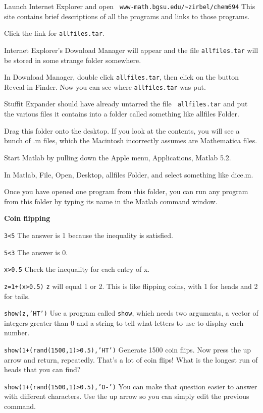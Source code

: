 \item Launch Internet Explorer and open {\tt
www-math.bgsu.edu/\~{}zirbel/chem694} 
This site contains brief descriptions of all the programs and links to
those programs.

\item Click the link for {\tt allfiles.tar}.

\item Internet Explorer's Download Manager will appear and the file
{\tt allfiles.tar} will be stored in some strange folder somewhere.

\item In Download Manager, double click {\tt allfiles.tar}, then click on
the button Reveal in Finder.  Now you can see where {\tt allfiles.tar} was
put.

\item Stuffit Expander should have already untarred the file {\tt
allfiles.tar} and put the various files it contains into a folder called
something like allfiles Folder.

\item Drag this folder onto the desktop.  If you look at the contents, you
will see a bunch of .m files, which the Macintosh incorrectly assumes are
Mathematica files.

\item Start Matlab by pulling down the Apple menu, Applications, Matlab
5.2.

\item In Matlab, File, Open, Desktop, allfiles Folder, and select something
like dice.m.

\item Once you have opened one program from this folder, you can run any
program from this folder by typing its name in the Matlab command window.

\hspace*{-0.5in}
{\bf Coin flipping}

\item {\tt 3<5} \hfill The answer is 1 because the inequality is satisfied.
\item {\tt 5<3} \hfill The answer is 0.
\item {\tt x>0.5} \hfill Check the inequality for each entry of x.  
\item {\tt z=1+(x>0.5)} \hfill {\tt z} will equal 1 or 2.  This is
like flipping coins, with 1 for heads and 2 for tails.
\item {\tt show(z,'HT')} \hfill Use a program called {\tt show},
which needs two arguments, a vector of integers greater than 0 and a string
to tell what letters to use to display each number.
\item {\tt show(1+(rand(1500,1)>0.5),'HT')} \hfill Generate 1500 coin
flips.  Now press the up arrow and return, repeatedly.  That's a lot of
coin flips!  What is the longest run of heads that you can find?
\item {\tt show(1+(rand(1500,1)>0.5),'O-')} \hfill You can make that
question easier to answer with different characters.  Use the up arrow so
you can simply edit the previous command.

